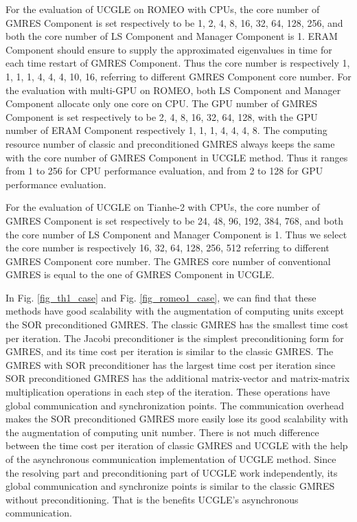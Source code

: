For the evaluation of UCGLE on ROMEO with CPUs, the core number of GMRES Component is set respectively to be 1, 2, 4, 8, 16, 32, 64, 128, 256, and both the core number of LS Component and Manager Component is 1. ERAM Component should ensure to supply the approximated eigenvalues in time for each time restart of GMRES Component. Thus the core number is respectively 1, 1, 1, 1, 4, 4, 4, 10, 16, referring to different GMRES Component core number. For the evaluation with multi-GPU on ROMEO, both LS Component and Manager Component allocate only one core on CPU. The GPU number of GMRES Component is set respectively to be 2, 4, 8, 16, 32, 64, 128, with the GPU number of ERAM Component respectively 1, 1, 1, 4, 4, 4, 8. The computing resource number of classic and preconditioned GMRES always keeps the same with the core number of GMRES Component in UCGLE method. Thus it ranges from 1 to 256 for CPU performance evaluation, and from 2 to 128 for GPU performance evaluation.

For the evaluation of UCGLE on Tianhe-2 with CPUs, the core number of GMRES Component is set respectively to be 24, 48, 96, 192, 384, 768, and both the core number of LS Component and Manager Component is 1. Thus we select the core number is respectively 16, 32, 64, 128, 256, 512 referring to different GMRES Component core number. The GMRES core number of conventional GMRES is equal to the one of GMRES Component in UCGLE.

In Fig. \ref{fig_th1_case} and Fig. \ref{fig_romeo1_case}, we can find that these methods have good scalability with the augmentation of computing units except the SOR preconditioned GMRES. The classic GMRES has the smallest time cost per iteration. The Jacobi preconditioner is the simplest preconditioning form for GMRES, and its time cost per iteration is similar to the classic GMRES. The GMRES with SOR preconditioner has the largest time cost per iteration since SOR preconditioned GMRES has the additional matrix-vector and matrix-matrix multiplication operations in each step of the iteration. These operations have global communication and synchronization points. The communication overhead makes the SOR preconditioned GMRES more easily lose its good scalability with the augmentation of computing unit number. There is not much difference between the time cost per iteration of classic GMRES and UCGLE with the help of the asynchronous communication implementation of UCGLE method. Since the resolving part and preconditioning part of UCGLE work independently, its global communication and synchronize points is similar to the classic GMRES without preconditioning. That is the benefits UCGLE's asynchronous communication. 

